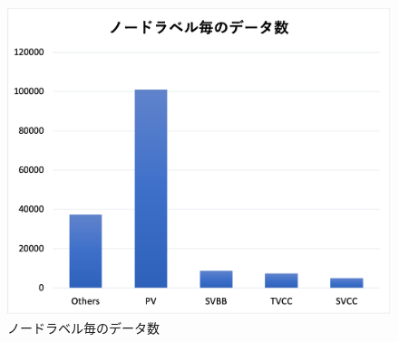 \begin{figure}[H]
	\begin{center}
 \includegraphics[keepaspectratio, scale=0.5]
 	{Figure/Flavortagging/imbalance.png}
 		\caption{ノードラベル毎のデータ数}
 		\label{node_imb}
	\end{center}
\end{figure}
